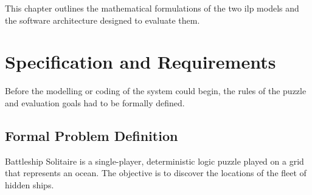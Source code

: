 %
%


This chapter outlines the mathematical formulations of the two \gls{ilp} models and the software architecture designed to evaluate them.

\section{Specification and Requirements}\label{sec:specification-and-requirements}
Before the modelling or coding of the system could begin, the rules of the puzzle and evaluation goals had to be formally defined.

\subsection{Formal Problem Definition}\label{subsec:formal-problem-definition}

Battleship Solitaire is a single-player, deterministic logic puzzle played on a grid that represents an ocean. The objective is to discover the locations of the fleet of hidden ships.

